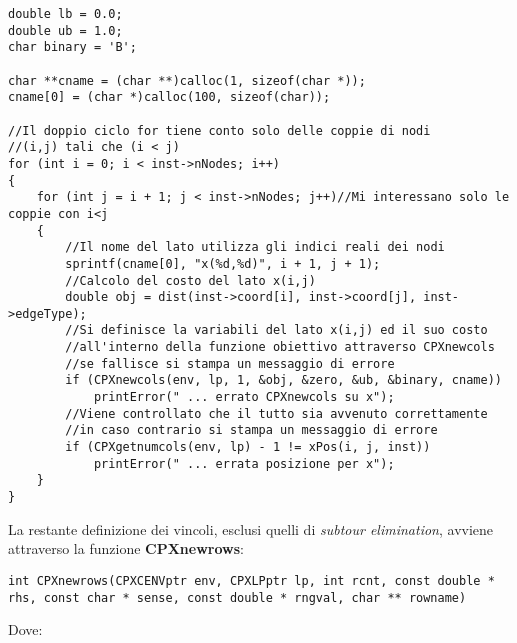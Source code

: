 \documentclass[11pt]{article}
\begin{document}
\begin{lstlisting}
double lb = 0.0;
double ub = 1.0;
char binary = 'B';

char **cname = (char **)calloc(1, sizeof(char *));
cname[0] = (char *)calloc(100, sizeof(char));

//Il doppio ciclo for tiene conto solo delle coppie di nodi
//(i,j) tali che (i < j)
for (int i = 0; i < inst->nNodes; i++)
{
    for (int j = i + 1; j < inst->nNodes; j++)//Mi interessano solo le coppie con i<j
    {
        //Il nome del lato utilizza gli indici reali dei nodi
        sprintf(cname[0], "x(%d,%d)", i + 1, j + 1);
        //Calcolo del costo del lato x(i,j)
        double obj = dist(inst->coord[i], inst->coord[j], inst->edgeType);
        //Si definisce la variabili del lato x(i,j) ed il suo costo
        //all'interno della funzione obiettivo attraverso CPXnewcols
        //se fallisce si stampa un messaggio di errore
        if (CPXnewcols(env, lp, 1, &obj, &zero, &ub, &binary, cname))
            printError(" ... errato CPXnewcols su x");
        //Viene controllato che il tutto sia avvenuto correttamente
        //in caso contrario si stampa un messaggio di errore
        if (CPXgetnumcols(env, lp) - 1 != xPos(i, j, inst))
            printError(" ... errata posizione per x");
    }
}
\end{lstlisting}

La restante definizione dei vincoli, esclusi quelli di \textit{subtour elimination}, avviene attraverso la funzione \textbf{CPXnewrows}:

\begin{lstlisting}
int CPXnewrows(CPXCENVptr env, CPXLPptr lp, int rcnt, const double * rhs, const char * sense, const double * rngval, char ** rowname)
\end{lstlisting}

Dove:
\end{document}
